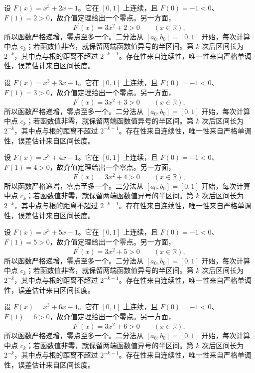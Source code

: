 \documentclass[UTF8,12pt,a4paper,fontset=fandol]{ctexart}
\begin{document}
\begin{solve}\label{ans:c6q8}
设 $F(x)=x^3+2x-1$。它在 $[0,1]$ 上连续，且 $F(0)=-1<0$、$F(1)=2>0$，故介值定理给出一个零点。另一方面，
\[
F^{\prime}(x)=3x^2+2>0\qquad(x\in\mathbb R),
\]
所以函数严格递增，零点至多一个。二分法从 $[a_0,b_0]=[0,1]$ 开始，每次计算中点 $c_k$；若函数值非零，就保留两端函数值异号的半区间。第 $k$ 次后区间长为 $2^{-k}$，其中点与根的距离不超过 $2^{-k-1}$。存在性来自连续性，唯一性来自严格单调性，误差估计来自区间长度。
\end{solve}

\begin{solve}\label{ans:c6q9}
设 $F(x)=x^3+3x-1$。它在 $[0,1]$ 上连续，且 $F(0)=-1<0$、$F(1)=3>0$，故介值定理给出一个零点。另一方面，
\[
F^{\prime}(x)=3x^2+3>0\qquad(x\in\mathbb R),
\]
所以函数严格递增，零点至多一个。二分法从 $[a_0,b_0]=[0,1]$ 开始，每次计算中点 $c_k$；若函数值非零，就保留两端函数值异号的半区间。第 $k$ 次后区间长为 $2^{-k}$，其中点与根的距离不超过 $2^{-k-1}$。存在性来自连续性，唯一性来自严格单调性，误差估计来自区间长度。
\end{solve}

\begin{solve}\label{ans:c6q10}
设 $F(x)=x^3+4x-1$。它在 $[0,1]$ 上连续，且 $F(0)=-1<0$、$F(1)=4>0$，故介值定理给出一个零点。另一方面，
\[
F^{\prime}(x)=3x^2+4>0\qquad(x\in\mathbb R),
\]
所以函数严格递增，零点至多一个。二分法从 $[a_0,b_0]=[0,1]$ 开始，每次计算中点 $c_k$；若函数值非零，就保留两端函数值异号的半区间。第 $k$ 次后区间长为 $2^{-k}$，其中点与根的距离不超过 $2^{-k-1}$。存在性来自连续性，唯一性来自严格单调性，误差估计来自区间长度。
\end{solve}

\begin{solve}\label{ans:c6q11}
设 $F(x)=x^3+5x-1$。它在 $[0,1]$ 上连续，且 $F(0)=-1<0$、$F(1)=5>0$，故介值定理给出一个零点。另一方面，
\[
F^{\prime}(x)=3x^2+5>0\qquad(x\in\mathbb R),
\]
所以函数严格递增，零点至多一个。二分法从 $[a_0,b_0]=[0,1]$ 开始，每次计算中点 $c_k$；若函数值非零，就保留两端函数值异号的半区间。第 $k$ 次后区间长为 $2^{-k}$，其中点与根的距离不超过 $2^{-k-1}$。存在性来自连续性，唯一性来自严格单调性，误差估计来自区间长度。
\end{solve}

\begin{solve}\label{ans:c6q12}
设 $F(x)=x^3+6x-1$。它在 $[0,1]$ 上连续，且 $F(0)=-1<0$、$F(1)=6>0$，故介值定理给出一个零点。另一方面，
\[
F^{\prime}(x)=3x^2+6>0\qquad(x\in\mathbb R),
\]
所以函数严格递增，零点至多一个。二分法从 $[a_0,b_0]=[0,1]$ 开始，每次计算中点 $c_k$；若函数值非零，就保留两端函数值异号的半区间。第 $k$ 次后区间长为 $2^{-k}$，其中点与根的距离不超过 $2^{-k-1}$。存在性来自连续性，唯一性来自严格单调性，误差估计来自区间长度。
\end{solve}
\end{document}
